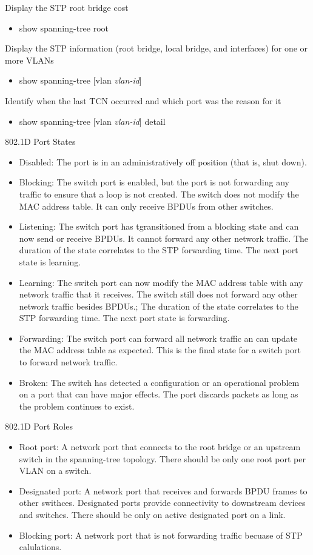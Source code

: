 \documentclass{article}
\begin{document}
Display the STP root bridge cost
\begin{itemize}
\item show spanning-tree root
\end{itemize}

Display the STP information (root bridge, local bridge, and interfaces) for one or more VLANs
\begin{itemize}
\item show spanning-tree [vlan \textit{vlan-id}]
\end{itemize}

Identify when the last TCN occurred and which port was the reason for it
\begin{itemize}
\item show spanning-tree [vlan \textit{vlan-id}] detail
\end{itemize}

802.1D Port States
\begin{itemize}
\item Disabled: The port is in an administratively off position (that is, shut down).
\item Blocking: The switch port is enabled, but the port is not forwarding any traffic to ensure that a loop is not created. The switch does not modify the MAC address table. It can only receive BPDUs from other switches.
\item Listening: The switch port has tgransitioned from a blocking state and can now send or receive BPDUs. It cannot forward any other network traffic. The duration of the state correlates to the STP forwarding time. The next port state is learning.
\item Learning: The switch port can now modify the MAC address table with any network traffic that it receives. The switch still does not forward any other network traffic besides BPDUs.; The duration of the state correlates to the STP forwarding time. The next port state is forwarding.
\item Forwarding: The switch port can forward all network traffic an can update the MAC address table as expected. This is the final state for a switch port to forward network traffic.
\item Broken: The switch has detected a configuration or an operational problem on a port that can have major effects. The port discards packets as long as the problem continues to exist.
\end{itemize}

802.1D Port Roles
\begin{itemize}
\item Root port: A network port that connects to the root bridge or an upstream switch in the spanning-tree topology. There should be only one root port per VLAN on a switch.
\item Designated port: A network port that receives and forwards BPDU frames to other swithces. Designated ports provide connectivity to downstream devices and switches. There should be only on active designated port on a link.
\item Blocking port: A network port that is not forwarding traffic becuase of STP calulations.
\end{itemize}
\end{document}
